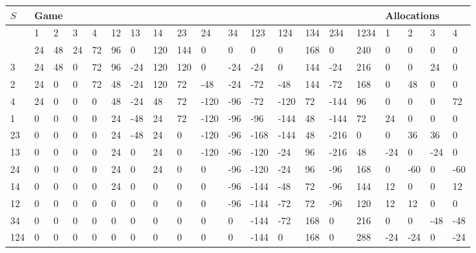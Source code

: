 \documentclass[12pt]{article}
\begin{document}
\begin{table}[h]
  \scriptsize
\centering
\begin{tabular}{|l|l|l|l|l|l|l|l|l|l|l|l|l|l|l|l|l|l|l|l|}
\hline
$S$     & \multicolumn{15}{l|}{Game}                                                              & \multicolumn{4}{l|}{Allocations} \\ \hline
     & 1  & 2  & 3  & 4  & 12 & 13  & 14  & 23  & 24   & 34  & 123  & 124  & 134 & 234  & 1234 & 1      & 2      & 3      & 4     \\ \hline
     & 24 & 48 & 24 & 72 & 96 & 0   & 120 & 144 & 0    & 0   & 0    & 0    & 168 & 0    & 240  & 0      & 0      & 0      & 0     \\ \hline
3    & 24 & 48 & 0  & 72 & 96 & -24 & 120 & 120 & 0    & -24 & -24  & 0    & 144 & -24  & 216  & 0      & 0      & 24     & 0     \\ \hline
2    & 24 & 0  & 0  & 72 & 48 & -24 & 120 & 72  & -48  & -24 & -72  & -48  & 144 & -72  & 168  & 0      & 48     & 0      & 0     \\ \hline
4    & 24 & 0  & 0  & 0  & 48 & -24 & 48  & 72  & -120 & -96 & -72  & -120 & 72  & -144 & 96   & 0      & 0      & 0      & 72    \\ \hline
1    & 0  & 0  & 0  & 0  & 24 & -48 & 24  & 72  & -120 & -96 & -96  & -144 & 48  & -144 & 72   & 24     & 0      & 0      & 0     \\ \hline
23   & 0  & 0  & 0  & 0  & 24 & -48 & 24  & 0   & -120 & -96 & -168 & -144 & 48  & -216 & 0    & 0      & 36     & 36     & 0     \\ \hline
13   & 0  & 0  & 0  & 0  & 24 & 0   & 24  & 0   & -120 & -96 & -120 & -24  & 96  & -216 & 48   & -24    & 0      & -24    & 0     \\ \hline
24   & 0  & 0  & 0  & 0  & 24 & 0   & 24  & 0   & 0    & -96 & -120 & -24  & 96  & -96  & 168  & 0      & -60    & 0      & -60   \\ \hline
14   & 0  & 0  & 0  & 0  & 24 & 0   & 0   & 0   & 0    & -96 & -144 & -48  & 72  & -96  & 144  & 12     & 0      & 0      & 12    \\ \hline
12   & 0  & 0  & 0  & 0  & 0  & 0   & 0   & 0   & 0    & -96 & -144 & -72  & 72  & -96  & 120  & 12     & 12     & 0      & 0     \\ \hline
34   & 0  & 0  & 0  & 0  & 0  & 0   & 0   & 0   & 0    & 0   & -144 & -72  & 168 & 0    & 216  & 0      & 0      & -48    & -48   \\ \hline
124  & 0  & 0  & 0  & 0  & 0  & 0   & 0   & 0   & 0    & 0   & -144 & 0    & 168 & 0    & 288  & -24    & -24    & 0      & -24   \\ \hline

\end{tabular}
\end{table}
\end{document}

